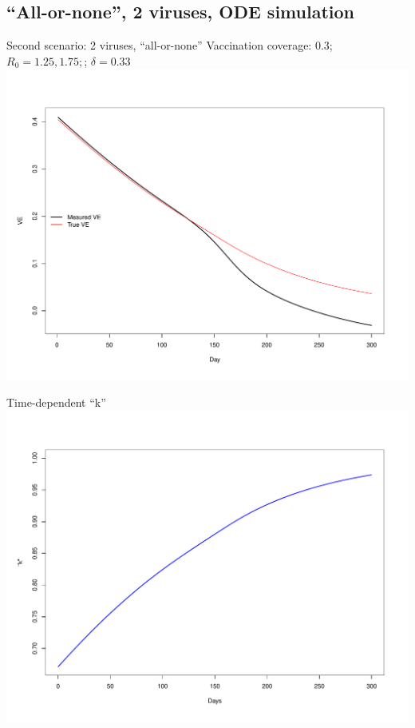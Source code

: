 \documentclass{beamer}
\begin{document}
\subsection{``All-or-none'', 2 viruses, ODE simulation}
\begin{frame}{Second scenario: 2 viruses, ``all-or-none''}
Vaccination coverage: 0.3; $R_0=1.25, 1.75;$; $\delta = 0.33$
\centering
\includegraphics[width=.8\textwidth]{VE_2_virus.pdf}
\end{frame}
%
\begin{frame}{Time-dependent ``k''}
\centering
\includegraphics[width=.9\textwidth]{k_time.pdf}
\end{frame}
%
\end{document}

